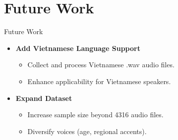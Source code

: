 \section{Future Work}
\begin{frame}{Future Work}
    \begin{itemize}
        \item \textbf{Add Vietnamese Language Support}
        \begin{itemize}
            \item Collect and process Vietnamese .wav audio files.
            \item Enhance applicability for Vietnamese speakers.
        \end{itemize}
        
        \item \textbf{Expand Dataset}
        \begin{itemize}
            \item Increase sample size beyond 4316 audio files.
            \item Diversify voices (age, regional accents).
        \end{itemize}
    \end{itemize}
\end{frame}